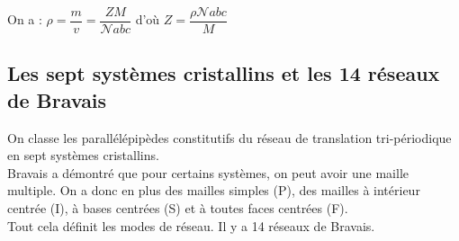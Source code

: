 \documentclass[13pt, twoside, a4paper, french, tikz]{report}
\begin{document}
    On a : $\rho = \dfrac{m}{v} = \dfrac{Z M}{\mathcal{N} abc}$ d'où $Z = \dfrac{\rho \mathcal{N} abc}{M}$

    \subsection{Les sept systèmes cristallins et les 14 réseaux de Bravais}\label{subsec:les-sept-systemes-cristallins-et-les-14-reseaux-de-bravais}

    On classe les parallélépipèdes constitutifs du réseau de translation tri-périodique en sept systèmes cristallins.\\

    Bravais a démontré que pour certains systèmes, on peut avoir une maille multiple.
    On a donc en plus des mailles simples (P), des mailles à intérieur centrée (I), à bases centrées (S) et à toutes faces centrées (F).\\
    Tout cela définit les modes de réseau.
    Il y a 14 réseaux de Bravais.\\
\end{document}
